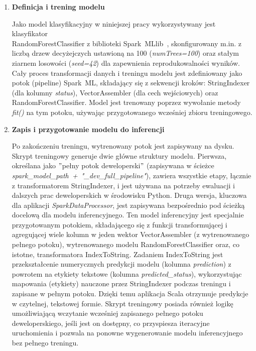 \begin{enumerate}
    \item \textbf{Definicja i trening modelu}

Jako model klasyfikacyjny w niniejszej pracy wykorzystywany jest klasyfikator \\ RandomForestClassifier z biblioteki \mbox{Spark MLlib}~\cite{spark_mllib_reference}, skonfigurowany m.in. z liczbą drzew decyżejczych ustawioną na 100 (\textit{numTrees=100}) oraz stałym ziarnem losowości (\textit{seed=42}) dla zapewnienia reprodukowalności wyników. Cały proces transformacji danych i treningu modelu jest zdefiniowany jako potok (pipeline) \mbox{Spark ML}, składający się z sekwencji kroków: StringIndexer (dla kolumny \textit{status}), VectorAssembler (dla cech wejściowych) oraz RandomForestClassifier. Model jest trenowany poprzez wywołanie metody \textit{fit()} na tym potoku, używając przygotowanego wcześniej zbioru treningowego.

    \item \textbf{Zapis i przygotowanie modelu do inferencji}

Po zakończeniu treningu, wytrenowany potok jest zapisywany na dysku. Skrypt treningowy generuje dwie główne struktury modelu. Pierwsza, określana jako \("\)pełny potok deweloperski\("\) (zapisywana w ścieżce \textit{\mbox{spark\_model\_path + "\_dev\_full\_pipeline"}}), zawiera wszystkie etapy, łącznie z transformatorem StringIndexer, i jest używana na potrzeby ewaluacji i dalszych prac deweloperskich w środowisku Python. Druga wersja, kluczowa dla aplikacji \textit{\mbox{SparkDataProcessor}}, jest zapisywana bezpośrednio pod ścieżką docelową dla modelu inferencyjnego. Ten model inferencyjny jest specjalnie przygotowanym potokiem, składającego się z funkcji transformującej i agregującej wiele kolumn w jeden wektor VectorAssembler (z wytrenowanego pełnego potoku), wytrenowanego modelu \mbox{RandomForestClassifier} oraz, co istotne, transformatora IndexToString. Zadaniem IndexToString jest przekształcenie numerycznych predykcji modelu (kolumna \textit{prediction}) z powrotem na etykiety tekstowe (kolumna \textit{\mbox{predicted\_status}}), wykorzystując mapowania (etykiety) nauczone przez StringIndexer podczas treningu i zapisane w pełnym potoku. Dzięki temu aplikacja Scala otrzymuje predykcje w czytelnej, tekstowej formie. Skrypt treningowy posiada również logikę umożliwiającą wczytanie wcześniej zapisanego pełnego potoku deweloperskiego, jeśli jest on dostępny, co przyspiesza iteracyjne uruchomienia i pozwala na ponowne wygenerowanie modelu inferencyjnego bez pełnego treningu.


\end{enumerate}
